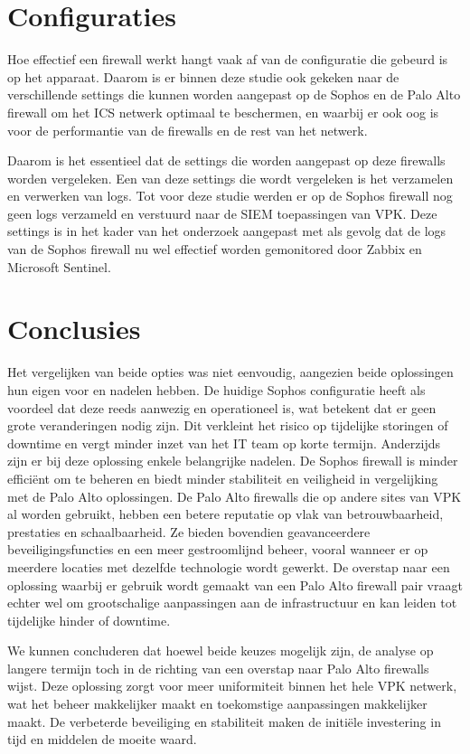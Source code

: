 \documentclass[a0,portrait]{hogent-poster}
\begin{document}
\begin{multicols}{2}
\section{Configuraties}

Hoe effectief een firewall werkt hangt vaak af van de configuratie die gebeurd is op het apparaat. Daarom is er binnen deze studie ook gekeken naar de verschillende settings die kunnen worden aangepast op de Sophos en de Palo Alto firewall om het ICS netwerk optimaal te beschermen, en waarbij er ook oog is voor de performantie van de firewalls en de rest van het netwerk.

Daarom is het essentieel dat de settings die worden aangepast op deze firewalls worden vergeleken. Een van deze settings die wordt vergeleken is het verzamelen en verwerken van logs. Tot voor deze studie werden er op de Sophos firewall nog geen logs verzameld en verstuurd naar de SIEM toepassingen van VPK. Deze settings is in het kader van het onderzoek aangepast met als gevolg dat de logs van de Sophos firewall nu wel effectief worden gemonitored door Zabbix en Microsoft Sentinel.

\section{Conclusies}

Het vergelijken van beide opties was niet eenvoudig, aangezien beide oplossingen hun eigen voor en nadelen hebben. De huidige Sophos configuratie heeft als voordeel dat deze reeds aanwezig en operationeel is, wat betekent dat er geen grote veranderingen nodig zijn. Dit verkleint het risico op tijdelijke storingen of downtime en vergt minder inzet van het IT team op korte termijn. Anderzijds zijn er bij deze oplossing enkele belangrijke nadelen. De Sophos firewall is minder efficiënt om te beheren en biedt minder stabiliteit en veiligheid in vergelijking met de Palo Alto oplossingen.
De Palo Alto firewalls die op andere sites van VPK al worden gebruikt, hebben een betere reputatie op vlak van betrouwbaarheid, prestaties en schaalbaarheid. Ze bieden bovendien geavanceerdere beveiligingsfuncties en een meer gestroomlijnd beheer, vooral wanneer er op meerdere locaties met dezelfde technologie wordt gewerkt. De overstap naar een oplossing waarbij er gebruik wordt gemaakt van een Palo Alto firewall pair vraagt echter wel om grootschalige aanpassingen aan de infrastructuur en kan leiden tot tijdelijke hinder of downtime. 

We kunnen concluderen dat hoewel beide keuzes mogelijk zijn, de analyse op langere termijn toch in de richting van een overstap naar Palo Alto firewalls wijst. Deze oplossing zorgt voor meer uniformiteit binnen het hele VPK netwerk, wat het beheer makkelijker maakt en toekomstige aanpassingen makkelijker maakt. De verbeterde beveiliging en stabiliteit maken de initiële investering in tijd en middelen de moeite waard.



\end{multicols}
\end{document}
